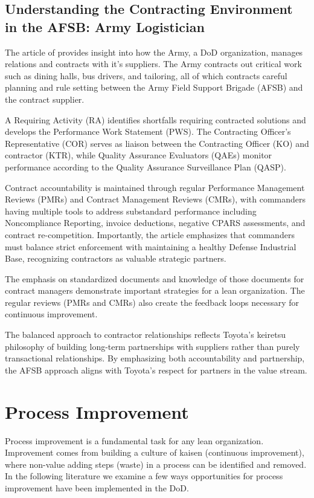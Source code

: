 \documentclass{article}
\begin{document}
	\subsection{Understanding the Contracting Environment in the AFSB: Army Logistician \cite{Carlstedt2020}}

		The article of \cite{Carlstedt2020} provides insight into how the Army, a DoD organization, manages relations and contracts with it's suppliers.
		The Army contracts out critical work such as dining halls, bus drivers, and tailoring, all of which contracts careful planning and rule setting between the Army Field Support Brigade (AFSB) and the contract supplier. 

		A Requiring Activity (RA) identifies shortfalls requiring contracted solutions and develops the Performance Work Statement (PWS). 
		The Contracting Officer's Representative (COR) serves as liaison between the Contracting Officer (KO) and contractor (KTR), while Quality Assurance Evaluators (QAEs) monitor performance according to the Quality Assurance Surveillance Plan (QASP). 

		Contract accountability is maintained through regular Performance Management Reviews (PMRs) and Contract Management Reviews (CMRs), with commanders having multiple tools to address substandard performance including Noncompliance Reporting, invoice deductions, negative CPARS assessments, and contract re-competition. 
		Importantly, the article emphasizes that commanders must balance strict enforcement with maintaining a healthy Defense Industrial Base, recognizing contractors as valuable strategic partners.

		The emphasis on standardized documents and knowledge of those documents for contract managers demonstrate important strategies for a lean organization.
		The regular reviews (PMRs and CMRs) also create the feedback loops necessary for continuous improvement.

		The balanced approach to contractor relationships reflects Toyota's keiretsu philosophy of building long-term partnerships with suppliers rather than purely transactional relationships. 
		By emphasizing both accountability and partnership, the AFSB approach aligns with Toyota's respect for partners in the value stream. 


	\section{Process Improvement}

		Process improvement is a fundamental task for any lean organization. 
		Improvement comes from building a culture of kaisen (continuous improvement), where non-value adding steps (waste) in a process can be identified and removed. In the following literature we examine a few ways opportunities for process improvement have been implemented in the DoD.
\end{document}
